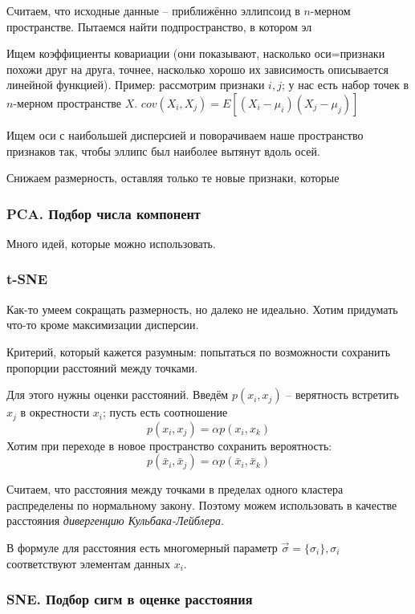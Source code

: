 \documentclass[main.tex]{subfiles}
\begin{document}
Считаем, что исходные данные -- приближённо эллипсоид в $n$-мерном пространстве.
Пытаемся найти подпространство, в котором эл

Ищем коэффициенты ковариации (они показывают, насколько оси=признаки похожи друг на друга, точнее, насколько хорошо их зависимость описывается линейной функцией).
Пример: рассмотрим признаки $ i,j $; у нас есть набор точек в $n$-мерном пространстве $ X $.
$ cov(X_i, X_j) = E[(X_i - \mu_i)(X_j - \mu_j)] $

Ищем оси с наибольшей дисперсией и поворачиваем наше пространство признаков так, чтобы эллипс был наиболее вытянут вдоль осей.

Снижаем размерность, оставляя только те новые признаки, которые 

\subsubsection{ PCA. Подбор числа компонент }


Много идей, которые можно использовать.

\subsubsection{t-SNE}

Как-то умеем сокращать размерность, но далеко не идеально.
Хотим придумать что-то кроме максимизации дисперсии.

Критерий, который кажется разумным: попытаться по возможности сохранить пропорции расстояний между точками.

Для этого нужны оценки расстояний.
Введём $ p(x_i, x_j) $ -- верятность встретить $x_j$ в окрестности $x_i$; пусть есть соотношение
$$ p(x_i, x_j) = \alpha p(x_i, x_k) $$
Хотим при переходе в новое пространство сохранить вероятность:
$$ p(\bar x_i, \bar x_j) = \alpha p(\bar x_i, \bar x_k) $$
  
Считаем, что расстояния между точками в пределах одного кластера распределены по нормальному закону.
Поэтому можем использовать в качестве расстояния \emph{дивергенцию Кульбака-Лейблера}.

В формуле для расстояния есть многомерный параметр $ \vec \sigma = \{ \sigma_i \}, \sigma_i  $ соответствуют элементам данных $x_i$.

\subsubsection{ SNE. Подбор сигм в оценке расстояния }
\end{document}
